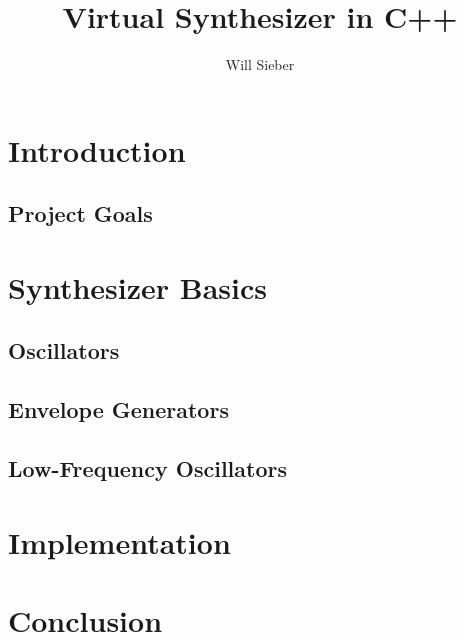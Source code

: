 \documentclass[12pt]{article}
\title{Virtual Synthesizer in C++}
\date{\vspace{-5ex}}
\author{Will Sieber}
\begin{document}
\maketitle

\tableofcontents
\newpage


\section{Introduction}


\subsection{Project Goals}

\section{Synthesizer Basics}

\subsection{Oscillators}

\subsection{Envelope Generators}

\subsection{Low-Frequency Oscillators}

\section{Implementation}


\section{Conclusion}




\end{document}
